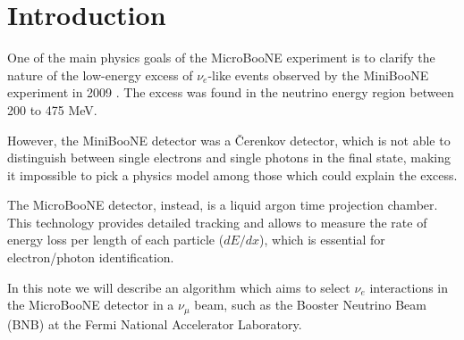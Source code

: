 
\section{Introduction}
One of the main physics goals of the MicroBooNE experiment is to clarify the nature of the low-energy excess of $\nu_{e}$-like events observed by the MiniBooNE experiment in 2009 \cite{miniboone}. The excess was found in the neutrino energy region between 200 to 475 MeV.

However, the MiniBooNE detector was a \v{C}erenkov detector, which is not able to distinguish between single electrons and single photons in the final state, making it impossible to pick a physics model among those which could explain the excess.

The MicroBooNE detector, instead, is a liquid argon time projection chamber. This technology provides detailed tracking and allows to measure the rate of energy loss per length of each particle ($dE/dx$), which is essential for electron/photon identification.

In this note we will describe an algorithm which aims to select $\nu_{e}$ interactions in the MicroBooNE detector in a $\nu_{\mu}$ beam, such as the Booster Neutrino Beam (BNB) at the Fermi National Accelerator Laboratory.
